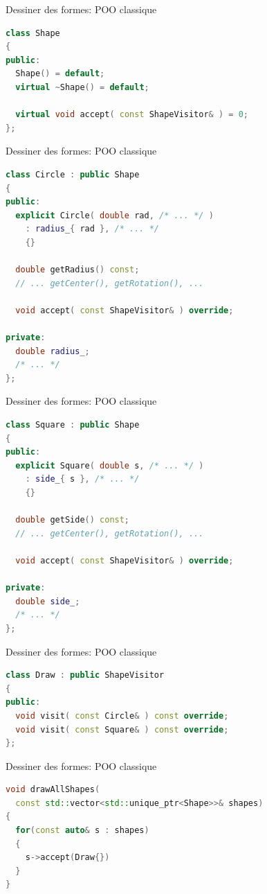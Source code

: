 \documentclass[french]{beamer}
\begin{document}
\begin{frame}[fragile]{Dessiner des formes: POO classique}
    \begin{lstlisting}[language=C++]
class Shape
{
public:
  Shape() = default;
  virtual ~Shape() = default;

  virtual void accept( const ShapeVisitor& ) = 0;
};
    \end{lstlisting}
\end{frame}

\begin{frame}[fragile]{Dessiner des formes: POO classique}
    \begin{lstlisting}[language=C++]
class Circle : public Shape
{
public:
  explicit Circle( double rad, /* ... */ )
    : radius_{ rad }, /* ... */
    {}
 
  double getRadius() const;
  // ... getCenter(), getRotation(), ...

  void accept( const ShapeVisitor& ) override;
 
private:
  double radius_;
  /* ... */
};
    \end{lstlisting}
\end{frame}

\begin{frame}[fragile]{Dessiner des formes: POO classique}
    \begin{lstlisting}[language=C++]
class Square : public Shape
{
public:
  explicit Square( double s, /* ... */ )
    : side_{ s }, /* ... */
    {}
 
  double getSide() const;
  // ... getCenter(), getRotation(), ...

  void accept( const ShapeVisitor& ) override;
 
private:
  double side_;
  /* ... */
};
    \end{lstlisting}
\end{frame}

\begin{frame}[fragile]{Dessiner des formes: POO classique}
    \begin{lstlisting}[language=C++]
class Draw : public ShapeVisitor
{
public:
  void visit( const Circle& ) const override;
  void visit( const Square& ) const override;
};
    \end{lstlisting}
\end{frame}

\begin{frame}[fragile]{Dessiner des formes: POO classique}
    \begin{lstlisting}[language=C++]
void drawAllShapes(
  const std::vector<std::unique_ptr<Shape>>& shapes)
{
  for(const auto& s : shapes)
  {
    s->accept(Draw{})
  }
}
    \end{lstlisting}
\end{frame}
\end{document}
